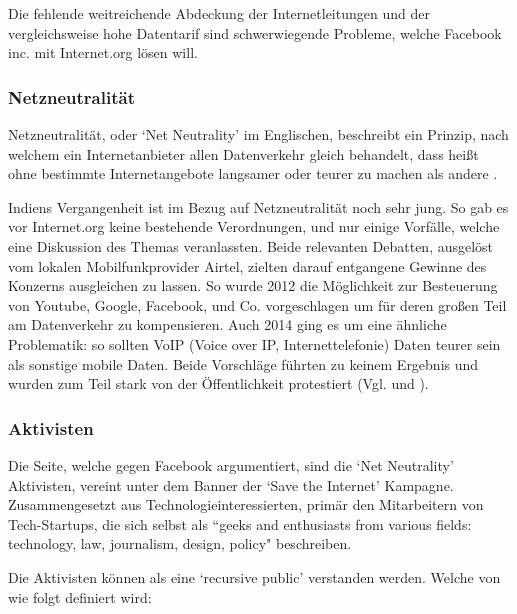 \documentclass{article}
\begin{document}
Die fehlende weitreichende Abdeckung der Internetleitungen und der vergleichsweise hohe Datentarif sind schwerwiegende Probleme, welche Facebook inc. mit Internet.org lösen will.

\subsubsection{Netzneutralität} \label{netzneutralität}

Netzneutralität, oder `Net Neutrality' im Englischen, beschreibt ein Prinzip, nach welchem ein Internetanbieter allen Datenverkehr gleich behandelt, dass heißt ohne bestimmte Internetangebote langsamer oder teurer zu machen als andere \autocite{netzneutralität}.

\medskip

Indiens Vergangenheit ist im Bezug auf Netzneutralität noch sehr jung. So gab es vor Internet.org keine bestehende Verordnungen, und nur einige Vorfälle, welche eine Diskussion des Themas veranlassten.
Beide relevanten Debatten, ausgelöst vom lokalen Mobilfunkprovider Airtel, zielten darauf entgangene Gewinne des Konzerns ausgleichen zu lassen.
So wurde 2012 die Möglichkeit zur Besteuerung von Youtube, Google, Facebook, und Co. vorgeschlagen um für deren großen Teil am Datenverkehr zu kompensieren.
Auch 2014 ging es um eine ähnliche Problematik: so sollten VoIP (Voice over IP, Internettelefonie) Daten teurer sein als sonstige mobile Daten.
Beide Vorschläge führten zu keinem Ergebnis und wurden zum Teil stark von der Öffentlichkeit protestiert (Vgl. \textcite[253]{everydayLife} und \textcite{airtelVoip}).

\subsubsection{Aktivisten}

Die Seite, welche gegen Facebook argumentiert, sind die `Net Neutrality' Aktivisten, vereint unter dem Banner der `Save the Internet' Kampagne.
Zusammengesetzt aus Technologieinteressierten, primär den Mitarbeitern von Tech-Startups, die sich selbst als ``geeks and enthusiasts from various fields: technology, law, journalism, design, policy" \parencite{sti2015} beschreiben.

\medskip

Die Aktivisten können als eine `recursive public' verstanden werden. Welche von \textcite{twoBits} wie folgt definiert wird:

\medskip
\end{document}
